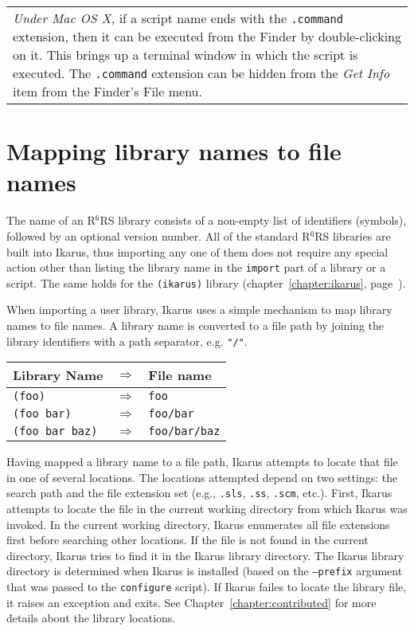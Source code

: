 \documentclass[onecolumn, 12pt, twoside, openright, dvipdfm]{book}
\newcommand{\rnrs}[1]{R$^{\mathrm{#1}}$RS}
\newcommand{\BoxedText}[2]{
  \vspace{.05in}
  \begin{center}
    \begin{tabular}{|p{4.6in}|} {\large \emph{#1}} #2 \end{tabular}
  \end{center}
  \vspace{.05in}
}
\begin{document}
\BoxedText{Under Mac OS X,}{if a script name ends with the
\texttt{.command} extension, then it can be executed from the Finder
by double-clicking on it.  This brings up a terminal window in which
the script is executed.  The \texttt{.command} extension can be
hidden from the \emph{Get Info} item from the Finder's File menu.}


\section{Mapping library names to file names}

The name of an \rnrs{6} library consists of a non-empty list of
identifiers (symbols), followed by an optional version number.  All
of the standard \rnrs{6} libraries are built into Ikarus, thus
importing any one of them does not require any special action other
than listing the library name in the \texttt{import} part of a
library or a script.  The same holds for the \texttt{(ikarus)}
library (chapter~\ref{chapter:ikarus},
page~\pageref{chapter:ikarus}).

When importing a user library, Ikarus uses a simple mechanism
to map library names to file names.  A library name is converted to
a file path by joining the library identifiers with a path
separator, e.g. \verb|"/"|.

\begin{center}
\begin{tabular}{lcl}
  Library Name & \hspace{2em}$\Rightarrow$\hspace{2em} & File name \\
  \hline
  \verb|(foo)|         & $\Rightarrow$ & \verb|foo| \\
  \verb|(foo bar)|     & $\Rightarrow$ & \verb|foo/bar| \\
  \verb|(foo bar baz)| & $\Rightarrow$ & \verb|foo/bar/baz| 
\end{tabular}
\end{center}


Having mapped a library name to a file path, Ikarus attempts to
locate that file in one of several locations.  The locations
attempted depend on two settings: the search path and the file
extension set (e.g., \verb|.sls|, \verb|.ss|, \verb|.scm|, etc.).
First, Ikarus attempts to locate the file in the current working
directory from which Ikarus was invoked.  In the current working
directory, Ikarus enumerates all file extensions first before
searching other locations.  If the file is not found in the current
directory, Ikarus tries to find it in the Ikarus library directory.
The Ikarus library directory is determined when Ikarus is installed
(based on the \texttt{--prefix} argument that was passed to the
\texttt{configure} script).  If Ikarus failes to locate the library
file, it raises an exception and exits.  See
Chapter~\ref{chapter:contributed} for more details about the library
locations.
\end{document}
